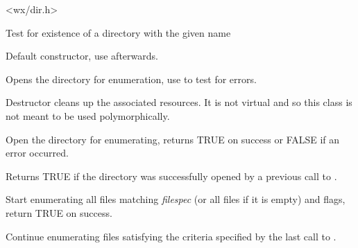 
<wx/dir.h>


\label{wxdirexists}


Test for existence of a directory with the given name

\label{wxdirwxdir}


Default constructor, use  afterwards.


Opens the directory for enumeration, use  
to test for errors.

\label{wxdirdtor}


Destructor cleans up the associated resources. It is not virtual and so this
class is not meant to be used polymorphically.

\label{wxdiropen}


Open the directory for enumerating, returns TRUE on success or FALSE if an
error occurred.

\label{wxdirisopened}


Returns TRUE if the directory was successfully opened by a previous call to 
.

\label{wxdirgetfirst}


Start enumerating all files matching {\it filespec} (or all files if it is
empty) and flags, return TRUE on success.

\label{wxdirgetnext}


Continue enumerating files satisfying the criteria specified by the last call
to .

